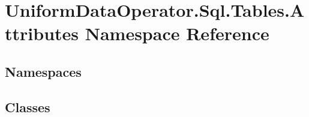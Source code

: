 \hypertarget{namespace_uniform_data_operator_1_1_sql_1_1_tables_1_1_attributes}{}\section{Uniform\+Data\+Operator.\+Sql.\+Tables.\+Attributes Namespace Reference}
\label{namespace_uniform_data_operator_1_1_sql_1_1_tables_1_1_attributes}
\subsection*{Namespaces}
\begin{DoxyCompactItemize}
\end{DoxyCompactItemize}
\subsection*{Classes}
